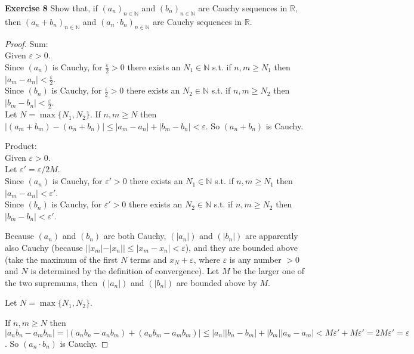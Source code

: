 \documentclass[12pt]{article}
\theoremstyle{definition}
\numberwithin{equation}{subsection}
\begin{document}
\textbf{Exercise 8} Show that, if $\left(a_{n}\right)_{n \in \mathbb{N}}$ and $\left(b_{n}\right)_{n \in \mathbb{N}}$ are Cauchy sequences
in $\mathbb{R},$ then $\left(a_{n}+b_{n}\right)_{n \in \mathbb{N}}$ and $\left(a_{n} \cdot b_{n}\right)_{n \in \mathbb{N}}$ are Cauchy sequences in $\mathbb{R}$.
\begin{proof}
    Sum:\\
    Given $\varepsilon > 0$.\\
    Since $\left(a_{n}\right)$ is Cauchy, for $\frac{\varepsilon}{2}>0$ there exists an $N_{1} \in \mathbb{N}$ s.t. if $n,m \geq N_{1}$ then $\left|a_{m}-a_{n}\right|<\frac{\varepsilon}{2}$.\\
    Since $\left(b_{n}\right)$ is Cauchy, for $\frac{\varepsilon}{2}>0$ there exists an $N_{2} \in \mathbb{N}$ s.t. if $n,m \geq N_{2}$ then $\left|b_{m}-b_{n}\right|<\frac{\varepsilon}{2}$.\\
    Let $N = \max\{N_1, N_2\}$. If $n,m \geq N$ then $|(a_m + b_m) - (a_n + b_n)| \leq |a_m - a_n| + |b_m - b_n| < \varepsilon$. So $(a_n+ b_n) $ is Cauchy. 



    \bigskip
    Product:\\ 
    Given $\varepsilon > 0$.\\
    Let $\varepsilon' = \varepsilon / 2M$.\\
    Since $\left(a_{n}\right)$ is Cauchy, for $\varepsilon'>0$ there exists an $N_{1} \in \mathbb{N}$ s.t. if $n,m \geq N_{1}$ then $\left|a_{m}-a_{n}\right|<\varepsilon'$.\\
    Since $\left(b_{n}\right)$ is Cauchy, for $\varepsilon'>0$ there exists an $N_{2} \in \mathbb{N}$ s.t. if $n,m \geq N_{2}$ then $\left|b_{m}-b_{n}\right|<\varepsilon'$.

    Because $(a_n)$ and $(b_n)$ are both Cauchy, $(|a_n|)$ and $(|b_n|)$ are apparently also Cauchy (because $||x_m| - |x_n|| \leq |x_m - x_n| < \varepsilon$), and they are bounded above (take the maximum of the first $N$ terms and $x_N+\varepsilon$, where $\varepsilon$ is any number $>0$ and $N$ is determined by the definition of convergence). Let $M$ be the larger one of the two supremums, then $(|a_n|)$ and $(|b_n|)$ are bounded above by $M$. 

    Let $N = \max\{N_1, N_2\}$. 
    
    If $n,m \geq N$ then $|a_{n} b_{n}-a_{m} b_{m}|=|\left(a_{n} b_{n}-a_{n} b_{m}\right)+\left(a_{n} b_{m}-a_{m} b_{m}\right)|\leq |a_n||b_n-b_m|+|b_m||a_n-a_m| < M\varepsilon' + M\varepsilon' = 2M\varepsilon' = \varepsilon$. So $(a_n\cdot b_n) $ is Cauchy. 

\end{proof}
\end{document}
